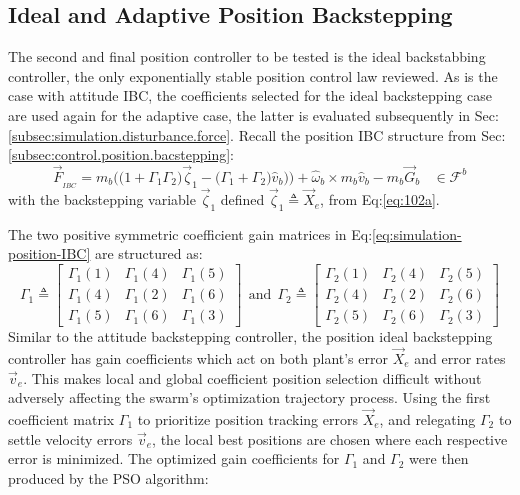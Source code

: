 \subsection{Ideal and Adaptive Position Backstepping}
\label{subsec:simulation.position.pd}
The second and final position controller to be tested is the ideal backstabbing controller, the only exponentially stable position control law reviewed. As is the case with attitude IBC, the coefficients selected for the ideal backstepping case are used again for the adaptive case, the latter is evaluated subsequently in Sec:\ref{subsec:simulation.disturbance.force}. Recall the position IBC structure from Sec:\ref{subsec:control.position.bacstepping}:
\begin{equation}\label{eq:simulation-position-IBC}
\vec{F}_{_{IBC}}=m_b\Big(\big(1+\Gamma_1\Gamma_2\big)\vec{\zeta}_1-\big(\Gamma_1+\Gamma_2\big)\hat{v}_b\big)\Big)+\hat{\omega}_b\times m_b\hat{v}_b-m_b\vec{G}_b~~~~\in\mathcal{F}^{b}
\end{equation}
with the backstepping variable $\vec{\zeta}_1$ defined $\vec{\zeta}_1\triangleq \vec{X}_e$, from Eq:\ref{eq:102a}. 
\par
The two positive symmetric coefficient gain matrices in Eq:\ref{eq:simulation-position-IBC} are structured as:
\begin{equation}\label{eq:simulation-position-diagonal-coefficients}
\Gamma_1\triangleq \begin{bmatrix}
\Gamma_1(1) & \Gamma_1(4) & \Gamma_1(5)\\
\Gamma_1(4) & \Gamma_1(2) & \Gamma_1(6)\\
\Gamma_1(5) & \Gamma_1(6) & \Gamma_1(3)
\end{bmatrix}
~~\text{and}~~\Gamma_2\triangleq \begin{bmatrix}
\Gamma_2(1) & \Gamma_2(4) & \Gamma_2(5)\\
\Gamma_2(4) & \Gamma_2(2) & \Gamma_2(6)\\
\Gamma_2(5) & \Gamma_2(6) & \Gamma_2(3)
\end{bmatrix}
\end{equation}
Similar to the attitude backstepping controller, the position ideal backstepping controller has gain coefficients which act on both plant's error $\vec{X}_e$ and error rates $\vec{v}_e$. This makes local and global coefficient position selection difficult without adversely affecting the swarm's optimization trajectory process. Using the first coefficient matrix $\Gamma_1$ to prioritize position tracking errors $\vec{X}_e$, and relegating $\Gamma_2$ to settle velocity errors $\vec{v}_e$, the local best positions are chosen where each respective error is minimized. The optimized gain coefficients for $\Gamma_1$ and $\Gamma_2$ were then produced by the PSO algorithm:
